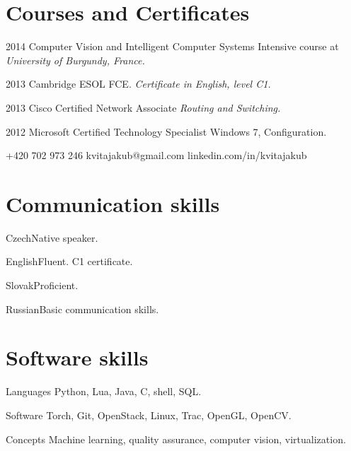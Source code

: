 \documentclass{tccv}
\begin{document}
\section{Courses and Certificates}

\begin{yearlist}
	
	\item{2014}
	{Computer Vision and Intelligent Computer Systems}
	{Intensive course at \emph{University of Burgundy, France.}}
	
	\item{2013}
	{Cambridge ESOL FCE.}
	{\emph{Certificate in English, level C1.}}
	
	\item{2013}
	{Cisco Certified Network Associate}
	{\emph{Routing and Switching.}}
	
	\item{2012}
	{Microsoft Certified Technology Specialist}
	{Windows 7, Configuration.}
	
\end{yearlist}

{+420 702 973 246}
{kvitajakub@gmail.com}
{linkedin.com/in/kvitajakub}

\section{Communication skills}

\begin{factlist}
\item{Czech}{Native speaker.}
\item{English}{Fluent. C1 certificate.}
\item{Slovak}{Proficient.}
\item{Russian}{Basic communication skills.}
\end{factlist}

\section{Software skills}

\begin{factlist}

\item{Languages}
     {Python, Lua, Java, C, shell, SQL.}

\item{Software}
     {Torch, Git, OpenStack, Linux, Trac, OpenGL, OpenCV.}

\item{Concepts}
     {Machine learning, quality assurance, computer vision, virtualization.}

\end{factlist}
\end{document}
